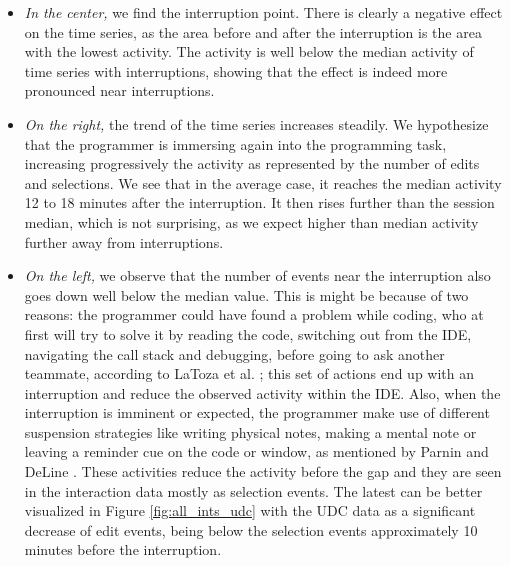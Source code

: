 \documentclass[times]{smrauth}
\begin{document}
\begin{itemize}
\item \textit{In the center,} we find the interruption point. There is clearly a negative effect on the time series, as the area before and after the interruption is the area with the lowest activity. The activity is well below the median activity of time series with interruptions, showing that the effect is indeed more pronounced near interruptions.

\item \textit{On the right,} the trend of the time series increases steadily. We hypothesize that the programmer is immersing again into the programming task, increasing progressively the activity as represented by the number of edits and selections. We see that in the average case, it reaches the median activity 12 to 18 minutes after the interruption. It then rises further than the session median, which is not surprising, as we expect higher than median activity further away from interruptions.

\item \textit{On the left,} we observe that the number of events near the interruption also goes down well below the median value. This is might be because of two reasons: the programmer could have found a problem while coding, who at first will try to solve it by reading the code, switching out from the IDE, navigating the call stack and debugging, before going to ask another teammate, according to LaToza et al. \cite{LVD06}; this set of actions end up with an interruption and reduce the observed activity within the IDE. Also, when the interruption is imminent or expected, the programmer make use of different suspension strategies like writing physical notes, making a mental note or leaving a reminder cue on the code or window, as mentioned by Parnin and DeLine \cite{PD10}. These activities reduce the activity before the gap and they are seen in the interaction data mostly as selection events. The latest can be better visualized in Figure \ref{fig:all_ints_udc} with the UDC data as a significant decrease of edit events, being below the selection events approximately 10 minutes before the interruption.

\end{itemize}
\end{document}
